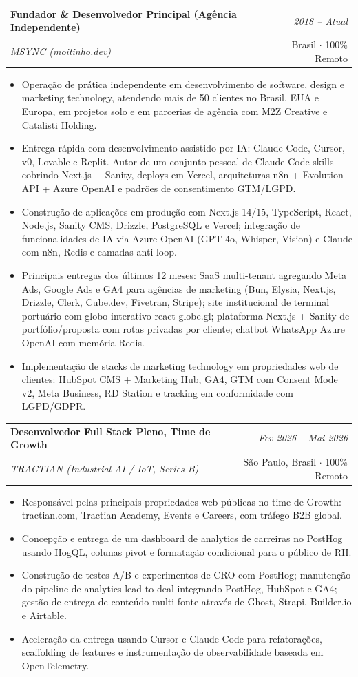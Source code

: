 \documentclass[a4paper,11pt]{article}
\makeatletter
\newcommand{\resumeSubheading}[4]{
\vspace{0.5mm}\item
    \begin{tabular*}{0.98\textwidth}[t]{l@{\extracolsep{\fill}}r}
        \textbf{#1} & \textit{\footnotesize{#4}} \\
        \textit{\footnotesize{#3}} &  \footnotesize{#2}\\
    \end{tabular*}
    \vspace{-2.4mm}
}
\newcommand{\resumeItemListStart}{\begin{justify}\begin{itemize}[leftmargin=3ex, rightmargin=2ex, noitemsep,labelsep=1.2mm,itemsep=0mm]\small}
\newcommand{\resumeItemListEnd}{\end{itemize}\end{justify}\vspace{-2mm}}
\makeatother
\begin{document}
  \resumeSubheading
  {Fundador \& Desenvolvedor Principal (Agência Independente)}{Brasil $\cdot$ 100\% Remoto}
  {MSYNC (moitinho.dev)}{2018 -- Atual}
  \resumeItemListStart
    \item{Operação de prática independente em desenvolvimento de software, design e marketing technology, atendendo mais de 50 clientes no Brasil, EUA e Europa, em projetos solo e em parcerias de agência com M2Z Creative e Catalisti Holding.}
    \item{Entrega rápida com desenvolvimento assistido por IA: Claude Code, Cursor, v0, Lovable e Replit. Autor de um conjunto pessoal de Claude Code skills cobrindo Next.js + Sanity, deploys em Vercel, arquiteturas n8n + Evolution API + Azure OpenAI e padrões de consentimento GTM/LGPD.}
    \item{Construção de aplicações em produção com Next.js 14/15, TypeScript, React, Node.js, Sanity CMS, Drizzle, PostgreSQL e Vercel; integração de funcionalidades de IA via Azure OpenAI (GPT-4o, Whisper, Vision) e Claude com n8n, Redis e camadas anti-loop.}
    \item{Principais entregas dos últimos 12 meses: SaaS multi-tenant agregando Meta Ads, Google Ads e GA4 para agências de marketing (Bun, Elysia, Next.js, Drizzle, Clerk, Cube.dev, Fivetran, Stripe); site institucional de terminal portuário com globo interativo react-globe.gl; plataforma Next.js + Sanity de portfólio/proposta com rotas privadas por cliente; chatbot WhatsApp Azure OpenAI com memória Redis.}
    \item{Implementação de stacks de marketing technology em propriedades web de clientes: HubSpot CMS + Marketing Hub, GA4, GTM com Consent Mode v2, Meta Business, RD Station e tracking em conformidade com LGPD/GDPR.}
  \resumeItemListEnd

  \resumeSubheading
  {Desenvolvedor Full Stack Pleno, Time de Growth}{São Paulo, Brasil $\cdot$ 100\% Remoto}
  {TRACTIAN (Industrial AI / IoT, Series B)}{Fev 2026 -- Mai 2026}
  \resumeItemListStart
    \item{Responsável pelas principais propriedades web públicas no time de Growth: tractian.com, Tractian Academy, Events e Careers, com tráfego B2B global.}
    \item{Concepção e entrega de um dashboard de analytics de carreiras no PostHog usando HogQL, colunas pivot e formatação condicional para o público de RH.}
    \item{Construção de testes A/B e experimentos de CRO com PostHog; manutenção do pipeline de analytics lead-to-deal integrando PostHog, HubSpot e GA4; gestão de entrega de conteúdo multi-fonte através de Ghost, Strapi, Builder.io e Airtable.}
    \item{Aceleração da entrega usando Cursor e Claude Code para refatorações, scaffolding de features e instrumentação de observabilidade baseada em OpenTelemetry.}
  \resumeItemListEnd
\end{document}
